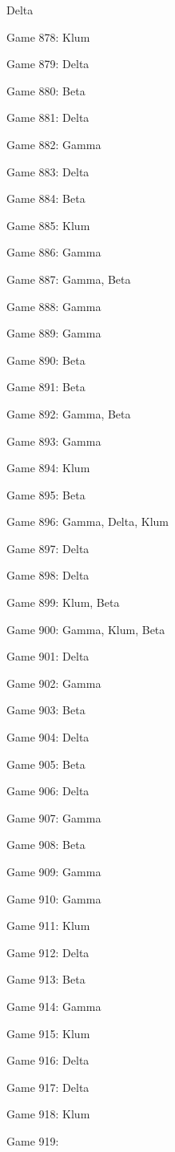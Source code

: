 \documentclass{article}
\begin{document}
\begin{multicols}{3}
\begin{compactitem}
Delta
\item Game 878:
Klum
\item Game 879:
Delta
\item Game 880:
Beta
\item Game 881:
Delta
\item Game 882:
Gamma
\item Game 883:
Delta
\item Game 884:
Beta
\item Game 885:
Klum
\item Game 886:
Gamma
\item Game 887:
Gamma, Beta
\item Game 888:
Gamma
\item Game 889:
Gamma
\item Game 890:
Beta
\item Game 891:
Beta
\item Game 892:
Gamma, Beta
\item Game 893:
Gamma
\item Game 894:
Klum
\item Game 895:
Beta
\item Game 896:
Gamma, Delta, Klum
\item Game 897:
Delta
\item Game 898:
Delta
\item Game 899:
Klum, Beta
\item Game 900:
Gamma, Klum, Beta
\item Game 901:
Delta
\item Game 902:
Gamma
\item Game 903:
Beta
\item Game 904:
Delta
\item Game 905:
Beta
\item Game 906:
Delta
\item Game 907:
Gamma
\item Game 908:
Beta
\item Game 909:
Gamma
\item Game 910:
Gamma
\item Game 911:
Klum
\item Game 912:
Delta
\item Game 913:
Beta
\item Game 914:
Gamma
\item Game 915:
Klum
\item Game 916:
Delta
\item Game 917:
Delta
\item Game 918:
Klum
\item Game 919:

\end{compactitem}
\end{multicols}
\end{document}

